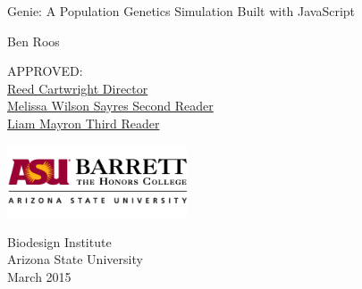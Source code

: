 \documentclass[12pt]{article}
\begin{document}

\begin{titlepage} %
    \begin{center}
        \Huge
        Genie: A Population Genetics Simulation Built with JavaScript
        
        \vspace{0.5cm}
        \large
        Ben Roos \\
        
        \vspace{1.5cm}
        
        APPROVED: \\
        \vspace{1cm}
        \underline{Reed Cartwright \hspace{10cm} Director} \\
        \vspace{1cm}
        \underline{Melissa Wilson Sayres \hspace{7.4cm} Second Reader} \\
        \vspace{1cm}
        \underline{Liam Mayron \hspace{9.5cm} Third Reader}
        
        \vspace{4cm}
        
        \includegraphics[width=0.4\textwidth]{images/barrett}
        
        \Large
        Biodesign Institute\\
        Arizona State University\\
        March 2015
        
    \end{center}
\end{titlepage}

\restoregeometry
\newpage

\tableofcontents
\listoffigures

\newpage
\end{document}
